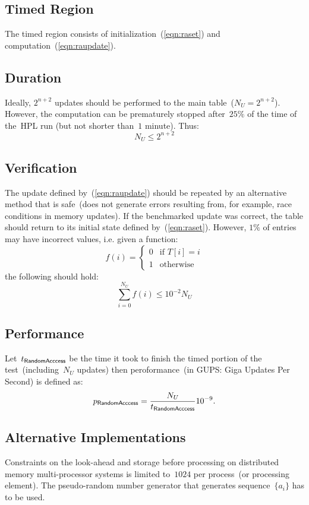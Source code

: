 \documentclass[twocolumn]{article}
\newcommand{\HPL}{\textsf{HPL}\xspace}
\newcommand{\randa}{\textsf{\scriptsize RandomAcccess}\xspace}
\begin{document}
\subsection{Timed Region}
The timed region consists of initialization~(\ref{eqn:raset}) and
computation~(\ref{eqn:raupdate}).

\subsection{Duration}
Ideally, $2^{n+2}$ updates should be performed to the main
table~($N_U=2^{n+2}$). However, the computation can be prematurely stopped
after~$25\%$ of the time of the~\HPL run (but not shorter than~$1$ minute). Thus:
\begin{equation}
  N_U \le 2^{n+2}
\end{equation}

\subsection{Verification}
The update defined by~(\ref{eqn:raupdate}) should be repeated by an
alternative method that is safe~(does not generate errors resulting from, for
example, race conditions in memory updates). If the benchmarked update was
correct, the table should return to its initial state defined
by~(\ref{eqn:raset}). However, $1\%$ of entries may have incorrect values,
i.e. given a function:
\begin{equation}
  f(i) = \left\{\begin{array}{ll}0 & \textrm{if } T[i]=i \\ 1 & \textrm{otherwise} \end{array}\right.
\end{equation}
the following should hold:
\begin{equation}
  \sum_{i=0}^{N_U}f(i) \le 10^{-2}N_U
\end{equation}

\subsection{Performance}
Let~$t_{\randa}$ be the time it took to finish the timed portion of the
test~(including~$N_U$ updates) then peroformance~(in GUPS: Giga Updates Per
Second) is defined as:
\begin{equation}
  p_{\randa} = \frac{N_U}{t_{\randa}} 10^{-9}.
\end{equation}

\subsection{Alternative Implementations}
Constraints on the look-ahead and storage before processing on distributed
memory multi-processor systems is limited to~$1024$ per process~(or
processing element). The pseudo-random number generator that generates
sequence~$\{a_i\}$ has to be used.
\end{document}
